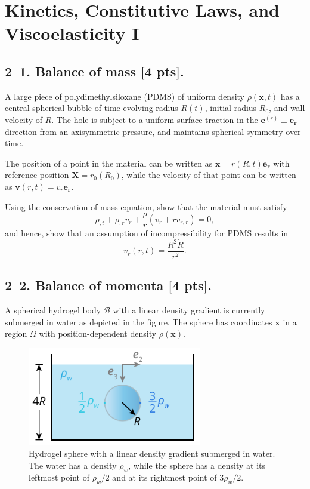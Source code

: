 \section*{Kinetics, Constitutive Laws, and Viscoelasticity I}

\subsection*{2--1. \textbf{Balance of mass} [4 pts].} 
A large piece of polydimethylsiloxane (PDMS) of uniform density $\rho(\bm{x},t)$ has a central spherical bubble of time-evolving radius $R(t)$, initial radius $R_0$, and wall velocity of $\dot{R}$. 
The hole is subject to a uniform surface traction in the $\bm{e}^{(r)} \equiv \bm{e}_{\bm{r}}$ direction from an axisymmetric pressure, and maintains spherical symmetry over time. 

\medskip
The position of a point in the material can be written as $\bm{x} = r(R,t) \bm{e}_{\bm{r}}$ with reference position $\bm{X} = r_0(R_0)$, while the velocity of that point can be written as $\bm{v}(r,t) = v_r \bm{e}_{\bm{r}}$.

\medskip
Using the conservation of mass equation, show that the material must satisfy
\begin{equation*}
\rho_{,t}+ \rho_{,r} v_r + \frac{\rho}{r} (v_r + r v_{r,r}) = 0,
\end{equation*}
and hence, show that an assumption of incompressibility for PDMS results in 
\begin{equation*}
v_r(r,t) = \frac{R^2 \dot{R}}{r^2}.
\end{equation*}

\medskip
\subsection*{2--2. \textbf{Balance of momenta} [4 pts].} A spherical hydrogel body $\mathcal{B}$ with a linear density gradient is currently submerged in water as depicted in the figure. 
The sphere has coordinates $\bm{x}$ in a region $\Omega$ with position-dependent density $\rho(\bm{x})$. 

\begin{figure}[H]
\vspace{-2em}
\centering
\includegraphics[width=3in]{instr-figures/PS2-Q1.pdf}
\caption{\small{Hydrogel sphere with a linear density gradient submerged in water. The water has a density $\rho_w$, while the sphere has a density at its leftmost point of $\rho_w/2$ and at its rightmost point of $3\rho_w/2$.}}
\end{figure}

